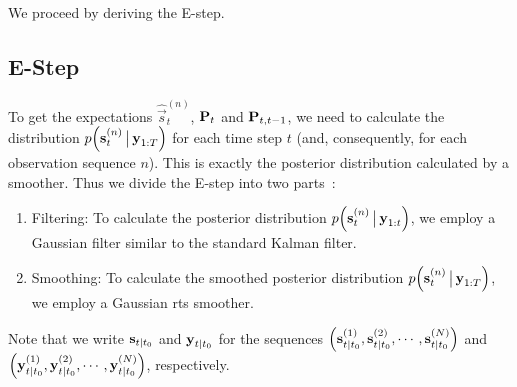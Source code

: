 	We proceed by deriving the E-step.

\subsection{E-Step}
	To get the expectations \( \hat{\vec{s}}_t^{(n)} \), \( \boldsymbol{\mathrm{P}}_{t} \) and \( \boldsymbol{\mathrm{P}}_{t, t - 1} \), we need to calculate the distribution \( p\Big(\boldsymbol{\mathrm{s}}_t^{(n)} \,\big\vert\, \boldsymbol{\mathrm{y}}_{1:T}\Big) \) for each time step \(t\) (and, consequently, for each observation sequence \(n\)). This is exactly the posterior distribution calculated by a smoother. Thus we divide the E-step into two parts~\cite{minkaHiddenMarkovModels1999}:
	\begin{enumerate}
		\item Filtering: To calculate the posterior distribution \( p\Big(\boldsymbol{\mathrm{s}}_t^{(n)} \,\big\vert\, \boldsymbol{\mathrm{y}}_{1:t}\Big) \), we employ a Gaussian filter similar to the standard Kalman filter.
		\item Smoothing: To calculate the smoothed posterior distribution \( p\Big(\boldsymbol{\mathrm{s}}_t^{(n)} \,\big\vert\, \boldsymbol{\mathrm{y}}_{1:T}\Big) \), we employ a Gaussian \ac{rts} smoother.
	\end{enumerate}
	Note that we write \( \boldsymbol{\mathrm{s}}_{t \vert t_0} \) and \( \boldsymbol{\mathrm{y}}_{t \vert t_0} \) for the sequences \( \Big(\boldsymbol{\mathrm{s}}_{t \vert t_0}^{(1)}, \boldsymbol{\mathrm{s}}_{t \vert t_0}^{(2)}, \cdots, \boldsymbol{\mathrm{s}}_{t \vert t_0}^{(N)}\Big) \) and \( \Big(\boldsymbol{\mathrm{y}}_{t\vert t_0}^{(1)}, \boldsymbol{\mathrm{y}}_{t \vert t_0}^{(2)}, \cdots, \boldsymbol{\mathrm{y}}_{t \vert t_0}^{(N)}\Big) \), respectively.

